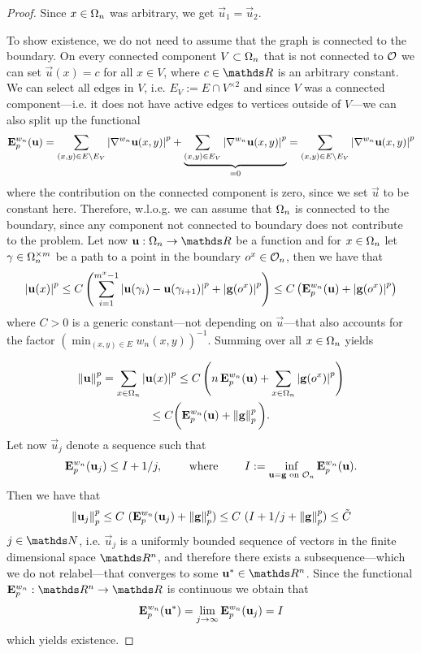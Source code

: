 \begin{proof}
%
Since $x\in\Omega_n$ was arbitrary, we get $\vec u_1 = \vec u_2$.\par
%
\noindent%
To show existence, we do not need to assume that the graph is connected to the boundary. On every connected component $V\subset \Omega_n$ that is not connected to $\mathcal{O}$ we can set $\vec u(x) = c$ for all $x\in V$, where $c\in\R$ is an arbitrary constant. We can select all edges in $V$, i.e. $E_V := E \cap V^{\times 2}$ and since $V$ was a connected component---i.e. it does not have active edges to vertices outside of $V$---we can also split up the functional
%
\begin{align*}
\mathbf{E}^{w_n}_{p}(\mathbf{u}) = \sum_{(x,y)\in E\setminus E_V} \left|\nabla^{w_n} \mathbf{u}(x,y)\right|^p
+
\underbrace{\sum_{(x,y)\in E_V} \left|\nabla^{w_n} \mathbf{u}(x,y)\right|^p}_{=0} = 
\sum_{(x,y)\in E\setminus E_V} \left|\nabla^{w_n} \mathbf{u}(x,y)\right|^p
\end{align*}
%
where the contribution on the connected component is zero, since we set $\vec u$ to be constant here. Therefore, w.l.o.g. we can assume that $\Omega_n$ is connected to the boundary, since any component not connected to boundary does not contribute to the problem. Let now $\vec u:\domain_n\to\R$ be a function and for $x\in\Omega_n$ let $\gamma \in \Omega_n^{\times m}$ be a path to a point in the boundary $o^x\in\mathcal{O}_n$, then we have that
%
\begin{gather*}
\left|\mathbf{u}(x)\right|^p \leq C\left(\sum_{i=1}^{m^x-1}\left|\mathbf{u}(\gamma_{i}) - \mathbf{u}(\gamma_{i+1})\right|^p + \left|\mathbf{g}(o^x)\right|^p\right) \leq 
C\left(\mathbf{E}^{w_n}_p(\mathbf{u}) + \left|\mathbf{g}(o^x)\right|^p\right)
\end{gather*}
%
where $C>0$ is a generic constant---not depending on $\vec u$---that also accounts for the factor $\left(\min_{(x,y)\in E}w_n(x,y)\right)^{-1}$. Summing over all $x\in\Omega_n$ yields

\begin{gather*}
\norm{\vec u}^p_p = \sum_{x\in\domain_n} \abs{\vec u(x)}^p \leq 
C\left( n\, \GE^{w_n}_p(\vec u) + \sum_{x\in\domain_n} \abs{\vec g(o^x)}^p\right)\\
%
\leq  C \bigg(\GE^{w_n}_p(\vec u) + \norm{\vec g}^p_p\bigg).
\end{gather*}
%
Let now $\vec u_j$ denote a sequence such that
%
\begin{align*}
\mathbf{E}^{w_n}_p(\mathbf{u}_j) \leq I + 1/j,\qquad\text{ where }\qquad
I := \inf_{\mathbf{u}=\mathbf{g}\text{ on } \mathcal{O}_n} \mathbf{E}^{w_n}_p(\mathbf{u}).
\end{align*}
%
Then we have that
%
\begin{align*}
\left\|\mathbf{u}_j\right\|^p_p \leq C\ (\mathbf{E}^{w_n}_p(\mathbf{u}_j) + \left\|\mathbf{g}\right\|^p_p)
\leq C\ (I + 1/j + \left\|\mathbf{g}\right\|^p_p) \leq \tilde C
\end{align*}
%
$j\in\N$, i.e. $\vec u_j$ is a uniformly bounded sequence of vectors in the finite dimensional space $\R^n$, and therefore there exists a subsequence---which we do not relabel---that converges to some $\vec u^\ast\in\R^n$. Since the functional $\GE^{w_n}_p:\R^n\to\R$ is continuous we obtain that
%
\begin{align*}
\mathbf{E}^{w_n}_p(\mathbf{u}^\ast) = \lim_{j\to\infty} \mathbf{E}^{w_n}_p(\mathbf{u}_j) = I
\end{align*}
%
which yields existence.
\end{proof}
%
%
